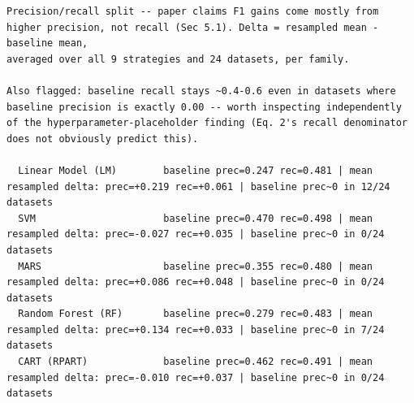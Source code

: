 \begingroup
{}
\label{tab:exp002_cmp_cmp_precision_recall}
\tiny
\begin{verbatim}
Precision/recall split -- paper claims F1 gains come mostly from
higher precision, not recall (Sec 5.1). Delta = resampled mean - baseline mean,
averaged over all 9 strategies and 24 datasets, per family.

Also flagged: baseline recall stays ~0.4-0.6 even in datasets where
baseline precision is exactly 0.00 -- worth inspecting independently
of the hyperparameter-placeholder finding (Eq. 2's recall denominator
does not obviously predict this).

  Linear Model (LM)        baseline prec=0.247 rec=0.481 | mean resampled delta: prec=+0.219 rec=+0.061 | baseline prec~0 in 12/24 datasets
  SVM                      baseline prec=0.470 rec=0.498 | mean resampled delta: prec=-0.027 rec=+0.035 | baseline prec~0 in 0/24 datasets
  MARS                     baseline prec=0.355 rec=0.480 | mean resampled delta: prec=+0.086 rec=+0.048 | baseline prec~0 in 0/24 datasets
  Random Forest (RF)       baseline prec=0.279 rec=0.483 | mean resampled delta: prec=+0.134 rec=+0.033 | baseline prec~0 in 7/24 datasets
  CART (RPART)             baseline prec=0.462 rec=0.491 | mean resampled delta: prec=-0.010 rec=+0.037 | baseline prec~0 in 0/24 datasets
\end{verbatim}
\endgroup
